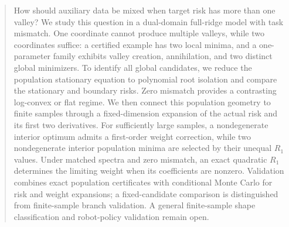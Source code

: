 \begin{abstract}
How should auxiliary data be mixed when target risk has more than one valley? We study this question in a dual-domain full-ridge model with task mismatch. One coordinate cannot produce multiple valleys, while two coordinates suffice: a certified example has two local minima, and a one-parameter family exhibits valley creation, annihilation, and two distinct global minimizers. To identify all global candidates, we reduce the population stationary equation to polynomial root isolation and compare the stationary and boundary risks. Zero mismatch provides a contrasting log-convex or flat regime. We then connect this population geometry to finite samples through a fixed-dimension expansion of the actual risk and its first two derivatives. For sufficiently large samples, a nondegenerate interior optimum admits a first-order weight correction, while two nondegenerate interior population minima are selected by their unequal $R_1$ values. Under matched spectra and zero mismatch, an exact quadratic $R_1$ determines the limiting weight when its coefficients are nonzero. Validation combines exact population certificates with conditional Monte Carlo for risk and weight expansions; a fixed-candidate comparison is distinguished from finite-sample branch validation. A general finite-sample shape classification and robot-policy validation remain open.
\end{abstract}
